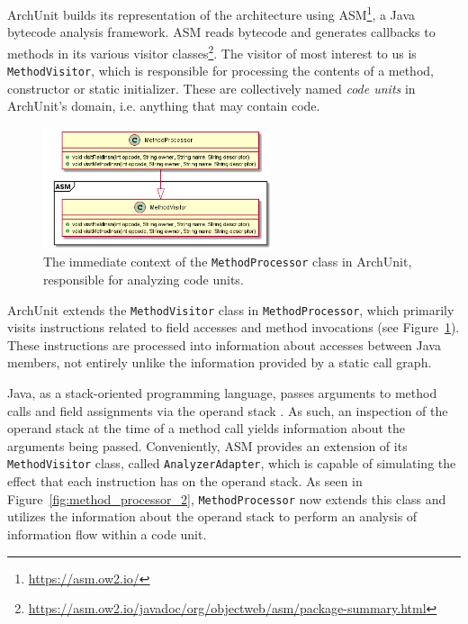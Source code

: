 ArchUnit builds its representation of the architecture using ASM\footnote{\url{https://asm.ow2.io/}}, a Java bytecode analysis framework. ASM reads bytecode and generates callbacks to methods in its various visitor classes\footnote{\url{https://asm.ow2.io/javadoc/org/objectweb/asm/package-summary.html}}. 
The visitor of most interest to us is \texttt{MethodVisitor}, which is responsible for processing the contents of a method, constructor or static initializer. These are collectively named \textit{code units} in ArchUnit's domain, i.e. anything that may contain code.

\begin{figure}
    \centering
    \includegraphics[width=0.6\textwidth]{figure/extension/MethodProcessor1.png}
    \caption{The immediate context of the \texttt{MethodProcessor} class in ArchUnit, responsible for analyzing code units.}
    \label{fig:method_processor_1}
\end{figure}

ArchUnit extends the \texttt{MethodVisitor} class in \texttt{MethodProcessor}, which primarily visits instructions related to field accesses and method invocations (see Figure~\ref{fig:method_processor_1}). These instructions are processed into information about accesses between Java members, not entirely unlike the information provided by a static call graph.

Java, as a stack-oriented programming language, passes arguments to method calls and field assignments via the operand stack \cite{hutchison_information_2005}. As such, an inspection of the operand stack at the time of a method call yields information about the arguments being passed.
Conveniently, ASM provides an extension of its \texttt{MethodVisitor} class, called \texttt{AnalyzerAdapter}, which is capable of simulating the effect that each instruction has on the operand stack. As seen in Figure~\ref{fig:method_processor_2}, \texttt{MethodProcessor} now extends this class and utilizes the information about the operand stack to perform an analysis of information flow within a code unit.


